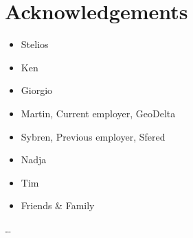 
\chapter*{Acknowledgements}

\begin{itemize}
    \item Stelios
    \item Ken
    \item Giorgio
    \item Martin, Current employer, GeoDelta 
    \item Sybren, Previous employer, Sfered
    \item Nadja
    \item Tim
    \item Friends \& Family
\end{itemize}

\ldots



 